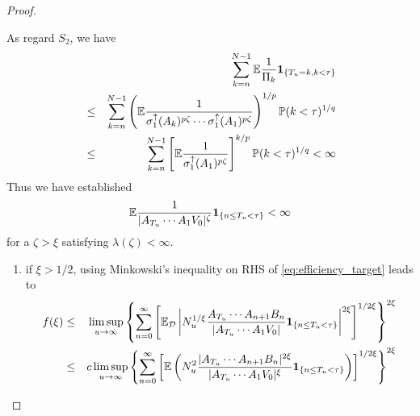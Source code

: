\documentclass{article}
\theoremstyle{remark}
\begin{document}
\begin{proof}
\begin{enumerate}
      As regard $S_2$, we have
      \begin{eqnarray*}
        && \sum_{k=n}^{N-1}
        \mathbb{E} {1 \over \Pi_k} \mathbf{1}_{\{T_u = k, k < \tau\}}\\ 
        &\leq& \sum_{k=n}^{N-1} \left(
          \mathbb{E} {
            1 \over
            \sigma^{\uparrow}_1(A_k)^{p \zeta} \cdots
            \sigma^{\uparrow}_1(A_1)^{p \zeta}}
        \right)^{1/p} \mathbb{P}(k < \tau)^{1/q} \\
        &\leq& \sum_{k=n}^{N-1} \left[
          \mathbb{E} {1 \over
            \sigma^{\uparrow}_1(A_1)^{p\zeta}
          }
        \right]^{k/p} \mathbb{P}(k < \tau)^{1/q} < \infty
      \end{eqnarray*}
      Thus we have established
      \[
      \mathbb{E} {1 \over |A_{T_u} \cdots A_1 V_0|^\zeta}\mathbf{1}_{\{n \leq T_u < \tau\}} < \infty
      \]
      for a $\zeta > \xi$ satisfying $\lambda(\zeta) < \infty$.
    \begin{enumerate}
    \item if $\xi > 1/2$, using Minkowski's inequality on RHS of
      \eqref{eq:efficiency_target} leads to
      \begin{eqnarray*}
        f(\xi) &\leq& \limsup_{u \to \infty}
        \left\{
          \sum_{n=0}^{\infty}
          \left[
            \mathbb{E}_{\mathcal D} \left|
              N_u^{1/\xi}
              \frac{
                A_{T_u} \cdots A_{n+1} B_n 
              }{
                |A_{T_u} \cdots A_1 V_0|
              }
              \mathbf{1}_{\{n \leq T_u < \tau\}}
            \right|^{2 \xi}
          \right]^{1/2\xi}
        \right\}^{2\xi} \\
        &\leq& c \limsup_{u \to \infty}
        \left\{
          \sum_{n=0}^{\infty}
          \left[
            \mathbb{E} \left(
              N_u^2
              \frac{
                |A_{T_u} \cdots A_{n+1} B_n|^{2\xi}
              }{
                |A_{T_u} \cdots A_1 V_0|^\xi
              }
              \mathbf{1}_{\{n \leq T_u < \tau\}}
            \right)
          \right]^{1/2\xi}
        \right\}^{2\xi}
      \end{eqnarray*}
    \end{enumerate}
  \end{enumerate}
\end{proof}




\end{document}
